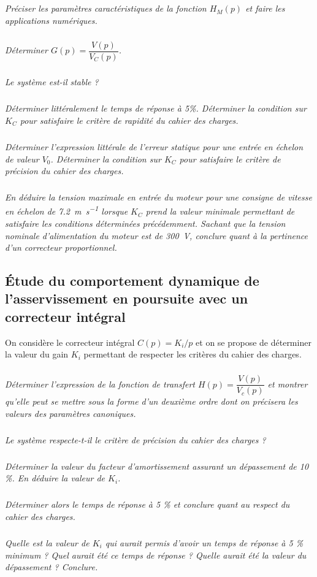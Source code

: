 \documentclass[10pt,fleqn]{article} %
\begin{document}
\subparagraph{}\textit{Préciser les paramètres caractéristiques de la fonction $H_M (p)$ et faire les applications numériques.}
\subparagraph{}\textit{Déterminer $G(p)=\dfrac{V(p)}{V_C(p)}$.}

\subparagraph{}\textit{Le système est-il stable ?}

\subparagraph{}\textit{Déterminer littéralement le temps de réponse à 5\%. Déterminer la condition sur $K_C$ pour satisfaire le critère de rapidité du cahier des charges. }

\subparagraph{}\textit{ Déterminer l’expression littérale de l’erreur statique pour une entrée en échelon de valeur $V_0$. Déterminer la condition sur $K_C$ pour satisfaire le critère de précision du cahier des charges.  }

\subparagraph{}\textit{En déduire la tension maximale en entrée du moteur pour une consigne de vitesse en échelon de \SI{7,2}{m.s^{-1}} lorsque $K_C$ prend la valeur minimale permettant de satisfaire les conditions déterminées précédemment. Sachant que la tension nominale d'alimentation du moteur est de  \SI{300}{V}, conclure quant à la pertinence d’un 
correcteur proportionnel. }

\subsection*{Étude du comportement dynamique de l’asservissement en poursuite avec un correcteur intégral }

On considère le correcteur intégral $C(p)=K_i/p$ et on se propose de déterminer la valeur du gain $K_i$ permettant de respecter les critères du cahier des charges. 


\subparagraph{}\textit{Déterminer l’expression de la fonction de transfert $H(p)=\dfrac{V(p)}{V_c(p)}$ et montrer qu’elle peut se mettre sous la forme d’un deuxième ordre dont on précisera les valeurs des paramètres canoniques.}

\subparagraph{}\textit{Le système respecte-t-il le critère de précision du cahier des charges ? }

\subparagraph{}\textit{Déterminer la valeur du facteur d’amortissement assurant un dépassement de 10 \%. En déduire la valeur de $K_i$. }

\subparagraph{}\textit{Déterminer alors le temps de réponse à 5 \% et conclure quant au respect du cahier des charges. }

\subparagraph{}\textit{Quelle est la valeur de $K_i$ qui aurait permis d’avoir un temps de réponse à 5 \% minimum ? Quel aurait été ce temps de réponse ? Quelle aurait été la valeur du dépassement ? Conclure. }
\end{document}

